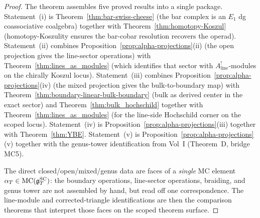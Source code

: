 \begin{proof}
The theorem assembles five proved results into a single package.
Statement~(i) is Theorem~\ref{thm:bar-swiss-cheese} (the bar
complex is an $E_1$ dg coassociative coalgebra) together with
Theorem~\ref{thm:homotopy-Koszul} (homotopy-Koszulity ensures
the bar-cobar resolution recovers the operad).
Statement~(ii) combines
Proposition~\ref{prop:alpha-projections}(ii) (the open projection
gives the line-sector operations) with
Theorem~\ref{thm:lines_as_modules}
\textup{(}which identifies that sector with
$A^!_{\mathrm{line}}$-modules on the chirally Koszul
locus\textup{)}.
Statement~(iii) combines
Proposition~\ref{prop:alpha-projections}(iv) (the mixed projection
gives the bulk-to-boundary map) with
Theorem~\ref{thm:boundary-linear-bulk-boundary} (bulk as derived
center in the exact sector) and
Theorem~\ref{thm:bulk_hochschild} together with
Theorem~\ref{thm:lines_as_modules}
\textup{(}for the line-side Hochschild corner on the scoped
locus\textup{)}.
Statement~(iv) is Proposition~\ref{prop:alpha-projections}(iii)
together with Theorem~\ref{thm:YBE}.
Statement~(v) is Proposition~\ref{prop:alpha-projections}(v)
together with the genus-tower identification from Vol~I
(Theorem~D, bridge MC5).

The direct closed/open/mixed/genus data are
faces of a \emph{single} MC element $\alpha_T \in \operatorname{MC}(\mathfrak{g}^{\mathrm{SC}}_T)$:
the boundary operations, line-sector operations, braiding, and genus
tower are not assembled by hand, but read off one correspondence.
The line-module and corrected-triangle identifications are then the
comparison theorems that interpret those faces on the scoped theorem
surface.
\end{proof}

